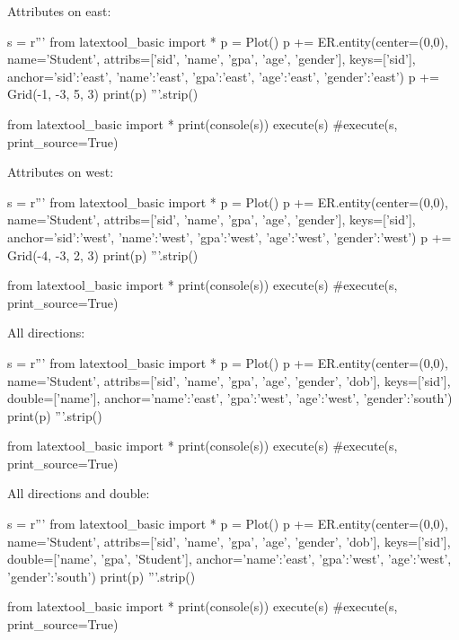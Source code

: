 \newpage
Attributes on east:
\begin{python}
s = r'''
from latextool_basic import *
p = Plot()
p += ER.entity(center=(0,0),
          name='Student',
          attribs=['sid', 'name', 'gpa', 'age', 'gender'],
          keys=['sid'],
          anchor={'sid':'east', 'name':'east', 'gpa':'east',
                  'age':'east',
                  'gender':'east'})
p += Grid(-1, -3, 5, 3)
print(p)
'''.strip()

from latextool_basic import *
print(console(s))
execute(s)
#execute(s, print_source=True)
\end{python}



\newpage
Attributes on west:
\begin{python}
s = r'''
from latextool_basic import *
p = Plot()
p += ER.entity(center=(0,0),
          name='Student',
          attribs=['sid', 'name', 'gpa', 'age', 'gender'],
          keys=['sid'],
          anchor={'sid':'west', 'name':'west', 'gpa':'west',
                  'age':'west', 'gender':'west'})
p += Grid(-4, -3, 2, 3)
print(p)
'''.strip()

from latextool_basic import *
print(console(s))
execute(s)
#execute(s, print_source=True)
\end{python}


\newpage
All directions:
\begin{python}
s = r'''
from latextool_basic import *
p = Plot()
p += ER.entity(center=(0,0),
          name='Student',
          attribs=['sid', 'name', 'gpa', 'age', 'gender', 'dob'],
          keys=['sid'],
          double=['name'],
          anchor={'name':'east', 'gpa':'west',
                  'age':'west', 'gender':'south'})
print(p)
'''.strip()

from latextool_basic import *
print(console(s))
execute(s)
#execute(s, print_source=True)
\end{python}

\newpage
All directions and double:
\begin{python}
s = r'''
from latextool_basic import *
p = Plot()
p += ER.entity(center=(0,0),
          name='Student',
          attribs=['sid', 'name', 'gpa', 'age', 'gender', 'dob'],
          keys=['sid'],
          double=['name', 'gpa', 'Student'],
          anchor={'name':'east', 'gpa':'west',
                  'age':'west', 'gender':'south'})
print(p)
'''.strip()

from latextool_basic import *
print(console(s))
execute(s)
#execute(s, print_source=True)
\end{python}

